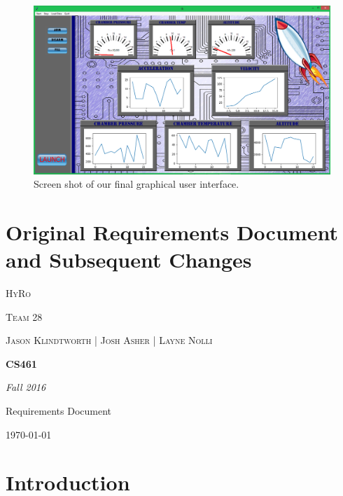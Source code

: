 \documentclass[10pt,draftclsnofoot,onecolumn,retainorgcmds]{IEEEtran}
\begin{document}
\begin{figure}[!ht]
	\caption{Screen shot of our final graphical user interface.}
	\centering
	\includegraphics[scale=.45]{HyroGui}
\end{figure}

\section{Original Requirements Document and Subsequent Changes}
\begin{titlepage}
	\centering
	{\scshape\LARGE HyRo \par}
	{\scshape\LARGE Team 28\par}
	\vspace{1cm}
	{\scshape\Large Jason Klindtworth  |  Josh Asher  |   Layne Nolli}
	\noindent\makebox[\linewidth]{\rule{17cm}{2pt}}
	\vspace{1cm}
	{\huge\bfseries CS461\par}
	\vspace{2cm}
	{\Large\itshape Fall 2016\par}
	\vspace{4cm}
	{\large Requirements Document\par}\vspace{8cm}
	\noindent\makebox[\linewidth]{\rule{17cm}{2pt}}
	\vfill
	
	{\large \today\par}
\end{titlepage}

\section{ Introduction}
\end{document}
